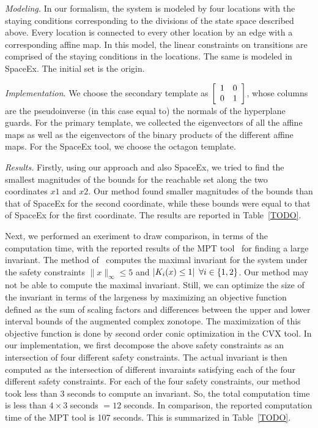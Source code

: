 \emph{Modeling.}  In our formalism, the system is modeled by four
locations with the staying conditions corresponding to the divisions
of the state space described above.  Every location is connected to
every other location by an edge with a corresponding affine map.  In
this model, the linear constraints on transitions are comprised of the
staying conditions in the locations.  The same is modeled in SpaceEx.
The initial set is the origin.

\emph{Implementation}.  We choose the secondary template as
$\left[\begin{array}{ll}1 & 0\\0 & 1\end{array}\right]$, whose columns are
the pseudoinverse (in this case equal to) the normals of the
hyperplane guards.  For the primary template, we collected the
eigenvectors of all the affine maps as well as the eigenvectors of the
binary products of the different affine maps. For the SpaceEx tool, we
choose the octagon template.

\emph{Results.}  Firstly, using our approach and also SpaceEx, we
tried to find the smallest magnitudes of the bounds for the reachable
set along the two coordinates $x1$ and $x2$.  Our method found smaller
magnitudes of the bounds than that of SpaceEx for the second
coordinate, while these bounds were equal to that of SpaceEx for the
first coordinate.  The results are reported in Table~\ref{TODO}.

Next, we performed an exeriment to draw comparison, in terms of the
computation time, with the reported results of the MPT
tool~\cite{TODO} for finding a large invariant.  The method
of~\cite{TODO} computes the maximal invariant for the system under the
safety constraints $\|x\|_{\infty}\leq 5$ and $\left|K_i(x)\leq
1\right|~\forall i\in\left\{1,2\right\}$.  Our method may not be able to
compute the maximal invariant.  Still, we can optimize the size of the
invariant in terms of the largeness by maximizing an objective function
defined as the sum of scaling factors and differences between the
upper and lower interval bounds of the augmented complex zonotope.
The maximization of this objective function is done by second order
conic optimization in the CVX tool.  In our implementation, we first
decompose the above safety constraints as an intersection of four
different safety constraints.  The actual invariant is then computed
as the intersection of different invaraints satisfying each of the
four different safety constraints.  For each of the four safety
constraints, our method took less than $3$ seconds to compute an
invariant.  So, the total computation time is less than $4\times 3$
seconds $=12$ seconds.  In comparison, the reported computation time
of the MPT tool is 107 seconds.  This is summarized in
Table~\ref{TODO}.

